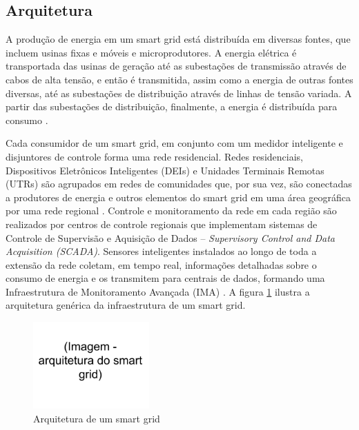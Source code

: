 \documentclass[cic,tc]{iiufrgs}
\begin{document}
\subsection{Arquitetura}

A produção de energia em um smart grid está distribuída em diversas fontes, que incluem usinas fixas e móveis e microprodutores. A energia elétrica é transportada das usinas de geração até as subestações de transmissão através de cabos de alta tensão, e então é transmitida, assim como a energia de outras fontes diversas, até as subestações de distribuição através de linhas de tensão variada. A partir das subestações de distribuição, finalmente, a energia é distribuída para consumo \cite{harb2013communication}.

Cada consumidor de um smart grid, em conjunto com um medidor inteligente e disjuntores de controle forma uma rede residencial. Redes residenciais, Dispositivos Eletrônicos Inteligentes (DEIs) e Unidades Terminais Remotas (UTRs) são agrupados em redes de comunidades que, por sua vez, são conectadas a produtores de energia e outros elementos do smart grid em uma área geográfica por uma rede regional \cite{li2012securing}. Controle e monitoramento da rede em cada região são realizados por centros de controle regionais que implementam sistemas de Controle de Supervisão e Aquisição de Dados – \textit{Supervisory Control and Data Acquisition (SCADA)}. Sensores inteligentes instalados ao longo de toda a extensão da rede coletam, em tempo real, informações detalhadas sobre o consumo de energia e os transmitem para centrais de dados, formando uma Infraestrutura de Monitoramento Avançada (IMA) \cite{2013survey}. A figura \ref{fig:sgarchitecture} ilustra a arquitetura genérica da infraestrutura de um smart grid.

\begin{figure}[h]
   \caption{Arquitetura de um smart grid}
   \begin{center}
       \includegraphics[width=12em]{tmp_img}
   \end{center}
   \label{fig:sgarchitecture}
\end{figure}
\end{document}
